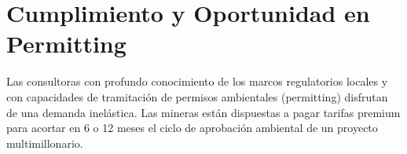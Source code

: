 \section{Cumplimiento y Oportunidad en Permitting}

Las consultoras con profundo conocimiento de los marcos regulatorios locales y con capacidades de tramitación de permisos ambientales (permitting) disfrutan de una demanda inelástica. Las mineras están dispuestas a pagar tarifas premium para acortar en 6 o 12 meses el ciclo de aprobación ambiental de un proyecto multimillonario.
